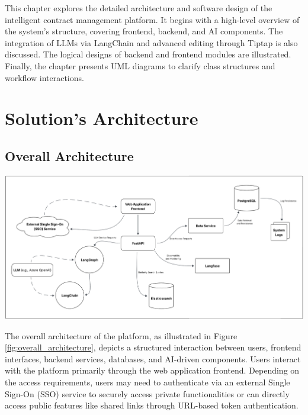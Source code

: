 This chapter explores the detailed architecture and software design of the intelligent contract management platform. It begins with a high-level overview of the system’s structure, covering frontend, backend, and AI components. The integration of LLMs via LangChain and advanced editing through Tiptap is also discussed. The logical designs of backend and frontend modules are illustrated. Finally, the chapter presents UML diagrams to clarify class structures and workflow interactions.

\newpage
{}
\hypertarget{thirdchapter}{}

\section{Solution's Architecture}

\subsection{Overall Architecture}
\begin{center}
    \centering
    \includegraphics[width=1\textwidth]{Images/Global Architecture of the Platform.png}
    \label{fig:overall_architecture}
\end{center}

The overall architecture of the platform, as illustrated in Figure \ref{fig:overall_architecture}, depicts a structured interaction between users, frontend interfaces, backend services, databases, and AI-driven components. Users interact with the platform primarily through the web application frontend. Depending on the access requirements, users may need to authenticate via an external Single Sign-On (SSO) service to securely access private functionalities or can directly access public features like shared links through URL-based token authentication.\mynewline

